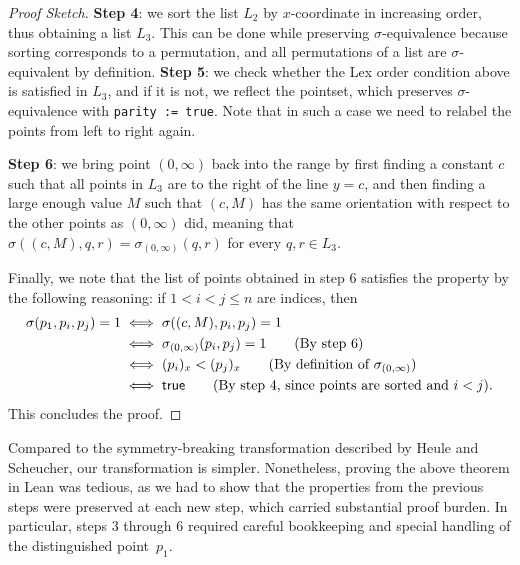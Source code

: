 \begin{proof}[Proof Sketch]
\textbf{Step 4}: we sort the list $L_2$ by $x$-coordinate in increasing order,
thus obtaining a list $L_3$.
This can be done while preserving $\sigma$-equivalence because sorting corresponds to a permutation,
and all permutations of a list are $\sigma$-equivalent by definition.
\textbf{Step 5}: we check whether the \textsf{Lex order} condition above is satisfied in $L_3$,
and if it is not, we reflect the pointset,
which preserves $\sigma$-equivalence with \lstinline|parity := true|.
Note that in such a case we need to relabel the points from left to right again.

\textbf{Step 6}: we bring point $(0, \infty)$ back into the range
by first finding a constant $c$ such that all points in $L_3$ are to the right of the line $y=c$,
and then finding a large enough value $M$ such that $(c, M)$ has the same orientation
with respect to the other points as $(0, \infty)$ did,
meaning that 
\(\sigma((c, M), q, r) = \sigma_{(0, \infty)}(q, r)\) for every $q, r \in L_3$.

Finally, we note that the list of points obtained in step 6
satisfies the  property by the following reasoning:
if $1 < i < j \leq n$ are indices, then 
\begin{align*}
  \sigma(p_1, p_i, p_j) = 1 &\iff \sigma((c, M), p_i, p_j) = 1\\
                            &\iff \sigma_{(0, \infty)}(p_i, p_j) = 1\tag{By step 6}\\
                            &\iff (p_i)_x < (p_j)_x \tag{By definition of $\sigma_{(0, \infty)}$}\\
                            &\iff \textsf{true} \tag{By step 4, since points are sorted and $i < j$}.
\end{align*}
This concludes the proof.
\end{proof}

Compared to the symmetry-breaking transformation described by Heule and Scheucher,
our transformation is simpler.
Nonetheless, proving the above theorem in Lean was tedious,
as we had to show that the properties from the previous steps were preserved at each new step,
which carried substantial proof burden.
In particular, steps 3 through 6 required careful bookkeeping and special handling of the distinguished point~$p_1$.
